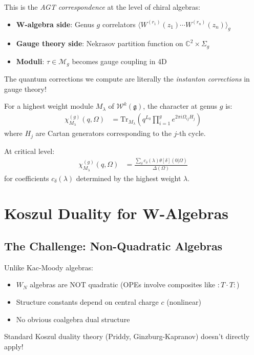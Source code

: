 \begin{remark}
This is the \emph{AGT correspondence} at the level of chiral algebras:
\begin{itemize}
\item \textbf{W-algebra side}: Genus $g$ correlators $\langle W^{(r_1)}(z_1) \cdots W^{(r_n)}(z_n) \rangle_g$
\item \textbf{Gauge theory side}: Nekrasov partition function on $\mathbb{C}^2 \times \Sigma_g$
\item \textbf{Moduli}: $\tau \in \mathcal{M}_g$ becomes gauge coupling in 4D
\end{itemize}

The quantum corrections we compute are literally the \emph{instanton corrections} in gauge theory!
\end{remark}

\begin{theorem}
For a highest weight module $M_\lambda$ of $\mathcal{W}^k(\mathfrak{g})$, the character at genus $g$ is:
\begin{align}
\chi_{M_\lambda}^{(g)}(q,\Omega) &= \text{Tr}_{M_\lambda}(q^{L_0} \prod_{i=1}^g e^{2\pi i \Omega_{ij} H_j})
\end{align}
where $H_j$ are Cartan generators corresponding to the $j$-th cycle.

At critical level:
\begin{align}
\chi_{M_\lambda}^{(g)}(q,\Omega) &= \frac{\sum_{\delta} c_\delta(\lambda) \theta[\delta](0|\Omega)}{\Delta(\Omega)}
\end{align}
for coefficients $c_\delta(\lambda)$ determined by the highest weight $\lambda$.
\end{theorem}

\section{Koszul Duality for W-Algebras}

\subsection{The Challenge: Non-Quadratic Algebras}

\begin{remark}
Unlike Kac-Moody algebras:
\begin{itemize}
\item $W_N$ algebras are NOT quadratic (OPEs involve composites like $: T \cdot T :$)
\item Structure constants depend on central charge $c$ (nonlinear)
\item No obvious coalgebra dual structure
\end{itemize}

Standard Koszul duality theory (Priddy, Ginzburg-Kapranov) doesn't directly apply!
\end{remark}

